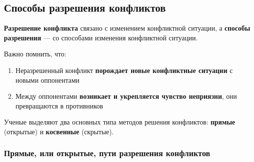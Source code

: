 \documentclass{article}
\begin{document}
\subsection{Способы разрешения конфликтов}

\textbf{Разрешение конфликта} связано с изменением конфликтной ситуации, а \textbf{способы разрешения} — со способами изменения конфликтной ситуации.

Важно помнить, что:

\begin{enumerate}
    \item Неразрешенный конфликт \textbf{порождает новые конфликтные ситуации} с новыми оппонентами
    \item Между оппонентами \textbf{возникает и укрепляется чувство неприязни}, они превращаются в противников
\end{enumerate}

Ученые выделяют два основных типа методов решения конфликтов: \textbf{прямые} (открытые) и \textbf{косвенные} (скрытые).

\subsubsection{Прямые, или открытые, пути разрешения конфликтов}
\end{document}
